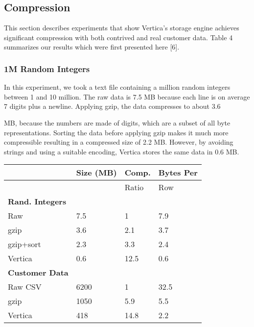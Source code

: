 \documentclass[a4paper,12pt,notitlepage,twoside,openright]{article}
\begin{document}
\hypertarget{compression}{%
\subsection{Compression}\label{compression}}

This section describes experiments that show Vertica's storage engine
achieves significant compression with both contrived and real customer
data. Table 4 summarizes our results which were first presented here
{[}6{]}.

\hypertarget{m-random-integers}{%
\subsubsection{1M Random Integers}\label{m-random-integers}}

In this experiment, we took a text file containing a million random
integers between 1 and 10 million. The raw data is 7.5 MB because each
line is on average 7 digits plus a newline. Applying gzip, the data
compresses to about 3.6

MB, because the numbers are made of digits, which are a subset of all
byte representations. Sorting the data before applying gzip makes it
much more compressible resulting in a compressed size of 2.2 MB.
However, by avoiding strings and using a suitable encoding, Vertica
stores the same data in 0.6 MB.

\begin{longtable}[]{@{}llll@{}}
\toprule
& Size (MB) & Comp. & Bytes Per\tabularnewline
\midrule
\endhead
\begin{minipage}[t]{0.22\columnwidth}\raggedright
\strut
\end{minipage} & \begin{minipage}[t]{0.22\columnwidth}\raggedright
\strut
\end{minipage} & \begin{minipage}[t]{0.22\columnwidth}\raggedright

Ratio
\strut
\end{minipage} & \begin{minipage}[t]{0.22\columnwidth}\raggedright
Row\strut
\end{minipage}\tabularnewline
\begin{minipage}[t]{0.22\columnwidth}\raggedright

\textbf{Rand. Integers}
\strut
\end{minipage} & \begin{minipage}[t]{0.22\columnwidth}\raggedright
\strut
\end{minipage} & \begin{minipage}[t]{0.22\columnwidth}\raggedright
\strut
\end{minipage} & \begin{minipage}[t]{0.22\columnwidth}\raggedright
\strut
\end{minipage}\tabularnewline
Raw & 7.5 & 1 & 7.9\tabularnewline
gzip & 3.6 & 2.1 & 3.7\tabularnewline
gzip+sort & 2.3 & 3.3 & 2.4\tabularnewline
Vertica & 0.6 & 12.5 & 0.6\tabularnewline
\textbf{Customer Data} & & &\tabularnewline
Raw CSV & 6200 & 1 & 32.5\tabularnewline
gzip & 1050 & 5.9 & 5.5\tabularnewline
Vertica & 418 & 14.8 & 2.2\tabularnewline
\bottomrule
\end{longtable}
\end{document}
